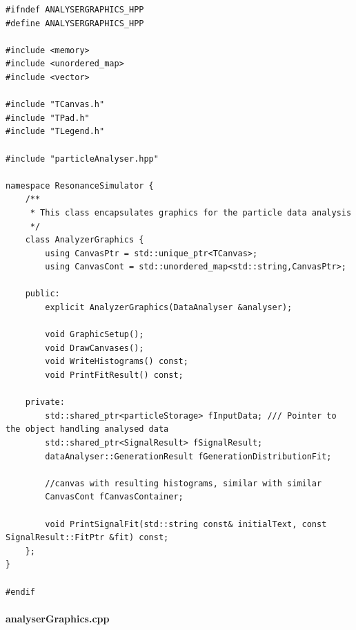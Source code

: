 \documentclass[12pt, a4paper]{article}
\begin{document}
\begin{verbatim}
#ifndef ANALYSERGRAPHICS_HPP
#define ANALYSERGRAPHICS_HPP

#include <memory>
#include <unordered_map>
#include <vector>

#include "TCanvas.h"
#include "TPad.h"
#include "TLegend.h"

#include "particleAnalyser.hpp"

namespace ResonanceSimulator {
    /**
     * This class encapsulates graphics for the particle data analysis
     */
    class AnalyzerGraphics {
        using CanvasPtr = std::unique_ptr<TCanvas>;
        using CanvasCont = std::unordered_map<std::string,CanvasPtr>;

    public:
        explicit AnalyzerGraphics(DataAnalyser &analyser);

        void GraphicSetup();
        void DrawCanvases();
        void WriteHistograms() const;
        void PrintFitResult() const;

    private:
        std::shared_ptr<particleStorage> fInputData; /// Pointer to the object handling analysed data
        std::shared_ptr<SignalResult> fSignalResult;
        dataAnalyser::GenerationResult fGenerationDistributionFit;

        //canvas with resulting histograms, similar with similar
        CanvasCont fCanvasContainer;

        void PrintSignalFit(std::string const& initialText, const SignalResult::FitPtr &fit) const;
    };
}

#endif 
\end{verbatim}

\paragraph{analyserGraphics.cpp}
\end{document}
